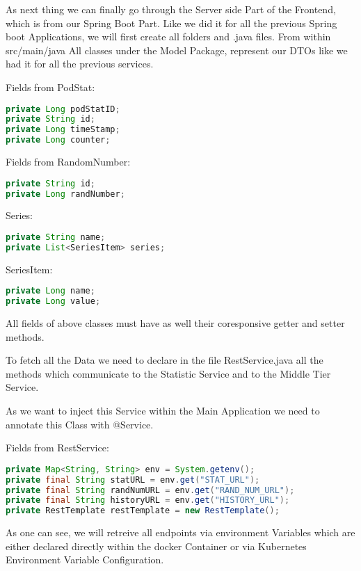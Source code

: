 As next thing we can finally go through the Server side Part of the Frontend, which is from our Spring Boot Part.
Like we did it for all the previous Spring boot Applications, we will first create all folders and .java files.
From within src/main/java
All classes under the Model Package, represent our DTOs like we had it for all the previous services.

Fields from PodStat:
\begin{lstlisting}[language=Java]
private Long podStatID;
private String id;
private Long timeStamp;
private Long counter;
\end{lstlisting}

Fields from RandomNumber:
\begin{lstlisting}[language=Java]
private String id;
private Long randNumber;
\end{lstlisting}

Series:
\begin{lstlisting}[language=Java]
private String name;
private List<SeriesItem> series;
\end{lstlisting}

SeriesItem:
\begin{lstlisting}[language=Java]
private Long name;
private Long value;
\end{lstlisting}

All fields of above classes must have as well their coresponsive getter and setter methods.

To fetch all the Data we need to declare in the file RestService.java all the methods which communicate to the Statistic Service and to the Middle Tier Service.

As we want to inject this Service within the Main Application we need to annotate this Class with @Service.

Fields from RestService:
\begin{lstlisting}[language=Java]
private Map<String, String> env = System.getenv();
private final String statURL = env.get("STAT_URL");
private final String randNumURL = env.get("RAND_NUM_URL");
private final String historyURL = env.get("HISTORY_URL");
private RestTemplate restTemplate = new RestTemplate();
\end{lstlisting}
As one can see, we will retreive all endpoints via environment Variables which are either declared directly within the docker Container or via Kubernetes Environment Variable Configuration.

